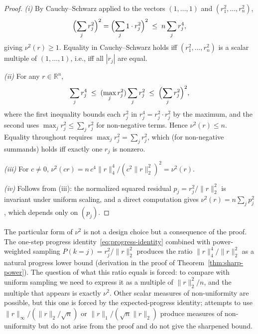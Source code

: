 \documentclass[pdflatex,sn-mathphys-num]{sn-jnl}%
\newcommand{\R}{\mathbb{R}}
\newcommand{\norm}[2]{\|#1\|_{#2}}
\theoremstyle{thmstyleone}%
\theoremstyle{thmstyletwo}%
\theoremstyle{thmstylethree}%
\begin{document}
\begin{proof}
\textit{(i)} By Cauchy--Schwarz applied to the vectors
$(1, \ldots, 1)$ and $(r_1^2, \ldots, r_n^2)$,
\[
\Bigl(\sum_j r_j^2\Bigr)^2 = \Bigl(\sum_j 1 \cdot r_j^2\Bigr)^2
\;\leq\; n \sum_j r_j^4,
\]
giving $\nu^2(r) \geq 1$. Equality in Cauchy--Schwarz holds iff
$(r_1^2, \ldots, r_n^2)$ is a scalar multiple of $(1, \ldots, 1)$,
i.e., iff all $|r_j|$ are equal.

\textit{(ii)} For any $r \in \R^n$,
\[
\sum_j r_j^4
\;\leq\; (\max_j r_j^2) \sum_j r_j^2
\;\leq\; \Bigl(\sum_j r_j^2\Bigr)^2,
\]
where the first inequality bounds each $r_j^2$ in $r_j^4 = r_j^2 \cdot r_j^2$
by the maximum, and the second uses $\max_j r_j^2 \leq \sum_j r_j^2$ for
non-negative terms. Hence $\nu^2(r) \leq n$. Equality throughout requires
$\max_j r_j^2 = \sum_j r_j^2$, which (for non-negative summands) holds iff
exactly one $r_j$ is nonzero.

\textit{(iii)} For $c \neq 0$,
$\nu^2(cr) = n\,c^4 \|r\|_4^4 / (c^2 \|r\|_2^2)^2 = \nu^2(r)$.

\textit{(iv)} Follows from (iii): the normalized squared residual
$p_j = r_j^2/\|r\|_2^2$ is invariant under uniform scaling, and a direct
computation gives $\nu^2(r) = n\sum_j p_j^2$, which depends only on $(p_j)$.
\end{proof}

The particular form of $\nu^2$ is not a design choice but a consequence of
the proof. The one-step progress identity~\eqref{eq:progress-identity}
combined with power-weighted sampling $P(k=j) = r_j^2/\norm{r}{2}^2$
produces the ratio $\norm{r}{4}^4/\norm{r}{2}^2$ as a natural progress
lower bound (derivation in the proof of Theorem~\ref{thm:sharp-power}).
The question of what this ratio equals is forced: to compare with uniform
sampling we need to express it as a multiple of $\norm{r}{2}^2/n$, and
the multiple that appears is exactly $\nu^2$.
Other scalar measures of non-uniformity are possible, but this one is forced by
the expected-progress identity; attempts to use
$\|r\|_\infty / (\|r\|_2/\sqrt n)$ or $\|r\|_1 / (\sqrt n \|r\|_2)$
produce measures of non-uniformity but do not arise from the proof
and do not give the sharpened bound.
\end{document}
